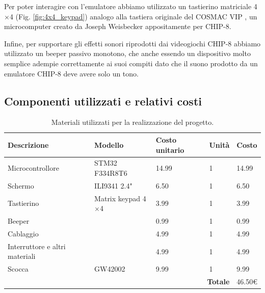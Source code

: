 \documentclass[a4paper]{article}
\begin{document}
Per poter interagire con l'emulatore abbiamo utilizzato un tastierino matriciale 4$\times$4
(Fig. \ref{fig:4x4_keypad}) analogo alla tastiera originale del
COSMAC VIP \cite{wikipedia:cosmacvip}, un microcomputer creato da Joseph Weisbecker appositamente per CHIP-8.

Infine, per supportare gli effetti sonori riprodotti dai videogiochi CHIP-8 abbiamo
utilizzato un beeper passivo monotono, che anche essendo un dispositivo molto semplice
adempie correttamente ai suoi compiti dato che il suono prodotto da un emulatore CHIP-8
deve avere solo un tono.

\subsection{Componenti utilizzati e relativi costi}

\begin{table}[h!t] %
    \centering
    \begin{tabular}{|llll|l|}
        \hline
        \multicolumn{1}{|l|}{\textbf{Descrizione}}          & \multicolumn{1}{l|}{\textbf{Modello}}       & \multicolumn{1}{l|}{\textbf{Costo unitario}} & \textbf{Unità} & \textbf{Costo} \\ \hline
        \multicolumn{1}{|l|}{Microcontrollore}       & \multicolumn{1}{l|}{STM32 F334R8T6}         & \multicolumn{1}{l|}{14.99}                   & 1               & 14.99          \\ \hline
        \multicolumn{1}{|l|}{Schermo}                & \multicolumn{1}{l|}{ILI9341 2.4"}           & \multicolumn{1}{l|}{6.50}                    & 1               & 6.50           \\ \hline
        \multicolumn{1}{|l|}{Tastierino}          & \multicolumn{1}{l|}{Matrix keypad 4$\times$4} & \multicolumn{1}{l|}{3.99}                    & 1               & 3.99           \\ \hline
        \multicolumn{1}{|l|}{Beeper}                 & \multicolumn{1}{l|}{}                       & \multicolumn{1}{l|}{0.99}                    & 1               & 0.99           \\ \hline
        \multicolumn{1}{|l|}{Cablaggio} & \multicolumn{1}{l|}{}                       & \multicolumn{1}{l|}{4.99}                    & 1               & 4.99           \\ \hline
        \multicolumn{1}{|l|}{Interruttore e altri materiali} & \multicolumn{1}{l|}{}       & \multicolumn{1}{l|}{4.99}                    & 1               & 4.99           \\ \hline
        \multicolumn{1}{|l|}{Scocca} & \multicolumn{1}{l|}{GW42002}                       & \multicolumn{1}{l|}{9.99}                    & 1               & 9.99           \\ \hline
        \multicolumn{4}{|r|}{\textbf{Totale}}                                                      & 46.50\euro    \\ \hline
    \end{tabular}
    \caption{
        Materiali utilizzati per la realizzazione del progetto.
    }
    \label{tab:components}
\end{table}
\end{document}
